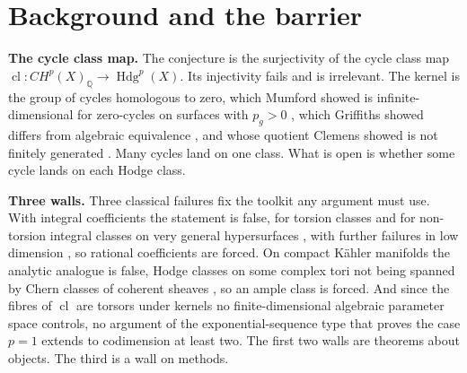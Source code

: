 \documentclass[10pt,twocolumn]{article}
\begin{document}
\hypertarget{background-and-the-barrier}{%
\section{Background and the barrier}\label{background-and-the-barrier}}

\textbf{The cycle class map.} The conjecture is the surjectivity of the
cycle class map
\(\operatorname{cl}\colon CH^p(X)_{\mathbb{Q}}\to\operatorname{Hdg}^p(X)\).
Its injectivity fails and is irrelevant. The kernel is the group of
cycles homologous to zero, which Mumford showed is infinite-dimensional
for zero-cycles on surfaces with \(p_g>0\) \cite{mumford1969}, which
Griffiths showed differs from algebraic equivalence
\cite{griffiths1969}, and whose quotient Clemens showed is not finitely
generated \cite{clemens1983}. Many cycles land on one class. What is
open is whether some cycle lands on each Hodge class.

\textbf{Three walls.} Three classical failures fix the toolkit any
argument must use. With integral coefficients the statement is false,
for torsion classes \cite{ah1962} and for non-torsion integral classes
on very general hypersurfaces \cite{kollar1992}, with further failures
in low dimension \cite{totaro1997,bo2020}, so rational coefficients are
forced. On compact Kähler manifolds the analytic analogue is false,
Hodge classes on some complex tori not being spanned by Chern classes of
coherent sheaves \cite{voisin2002}, so an ample class is forced. And
since the fibres of \(\operatorname{cl}\) are torsors under kernels no
finite-dimensional algebraic parameter space controls, no argument of
the exponential-sequence type that proves the case \(p=1\) extends to
codimension at least two. The first two walls are theorems about
objects. The third is a wall on methods.
\end{document}
